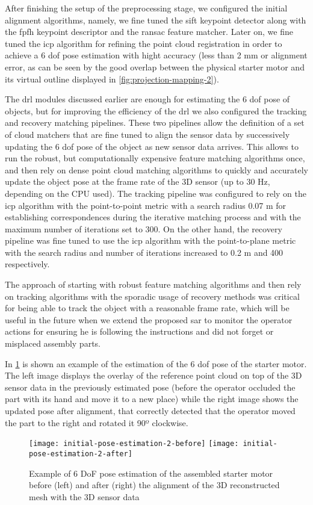 After finishing the setup of the preprocessing stage, we configured the initial alignment algorithms, namely, we fine tuned the \gls{sift} keypoint detector along with the \gls{fpfh} keypoint descriptor and the \gls{ransac} feature matcher. Later on, we fine tuned the \gls{icp} algorithm for refining the point cloud registration in order to achieve a 6 \gls{dof} pose estimation with hight accuracy (less than 2 mm or alignment error, as can be seen by the good overlap between the physical starter motor and its virtual outline displayed in \cref{fig:projection-mapping-2}).

The drl modules discussed earlier are enough for estimating the 6 \gls{dof} pose of objects, but for improving the efficiency of the drl we also configured the tracking and recovery matching pipelines. These two pipelines allow the definition of a set of cloud matchers that are fine tuned to align the sensor data by successively updating the 6 \gls{dof} pose of the object as new sensor data arrives. This allows to run the robust, but computationally expensive feature matching algorithms once, and then rely on dense point cloud matching algorithms to quickly and accurately update the object pose at the frame rate of the 3D sensor (up to 30 Hz, depending on the CPU used). The tracking pipeline was configured to rely on the \gls{icp} algorithm with the point-to-point metric with a search radius 0.07 m for establishing correspondences during the iterative matching process and with the maximum number of iterations set to 300. On the other hand, the recovery pipeline was fine tuned to use the \gls{icp} algorithm with the point-to-plane metric with the search radius and number of iterations increased to 0.2 m and 400 respectively.

The approach of starting with robust feature matching algorithms and then rely on tracking algorithms with the sporadic usage of recovery methods was critical for being able to track the object with a reasonable frame rate, which will be useful in the future when we extend the proposed \gls{sar} to monitor the operator actions for ensuring he is following the instructions and did not forget or misplaced assembly parts.

In \cref{fig:initial-pose-estimation} is shown an example of the estimation of the 6 \gls{dof} pose of the starter motor. The left image displays the overlay of the reference point cloud on top of the 3D sensor data in the previously estimated pose (before the operator occluded the part with its hand and move it to a new place) while the right image shows the updated pose after alignment, that correctly detected that the operator moved the part to the right and rotated it 90º clockwise.

\begin{figure}[!ht]
	\centering
	\texttt{[image: initial-pose-estimation-2-before]}
	\texttt{[image: initial-pose-estimation-2-after]}
	\caption{Example of 6 DoF pose estimation of the assembled starter motor before (left) and after (right) the alignment of the 3D reconstructed mesh with the 3D sensor data}
	\label{fig:initial-pose-estimation}
\end{figure}
